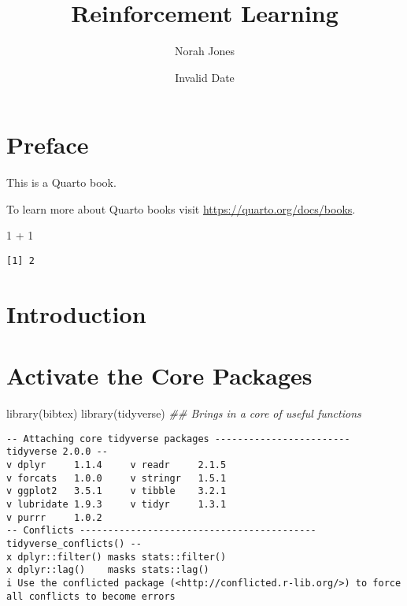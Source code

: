 \documentclass[
  letterpaper,
  DIV=11,
  numbers=noendperiod]{scrreprt}
\title{Reinforcement Learning}
\author{Norah Jones}
\date{Invalid Date}
\newenvironment{Shaded}{\begin{snugshade}}{\end{snugshade}}
\newcommand{\DecValTok}[1]{\textcolor[rgb]{0.68,0.00,0.00}{#1}}
\newcommand{\DocumentationTok}[1]{\textcolor[rgb]{0.37,0.37,0.37}{\textit{#1}}}
\newcommand{\FunctionTok}[1]{\textcolor[rgb]{0.28,0.35,0.67}{#1}}
\newcommand{\NormalTok}[1]{\textcolor[rgb]{0.00,0.23,0.31}{#1}}
\newcommand{\SpecialCharTok}[1]{\textcolor[rgb]{0.37,0.37,0.37}{#1}}
\renewcommand*\contentsname{Table of contents}
\newcommand\contentsname{Table of contents}
\begin{document}
\maketitle

\renewcommand*\contentsname{Table of contents}
{
\hypersetup{linkcolor=}
\setcounter{tocdepth}{2}
\tableofcontents
}


\chapter*{Preface}\label{preface}


This is a Quarto book.

To learn more about Quarto books visit
\url{https://quarto.org/docs/books}.

\begin{Shaded}
\begin{Highlighting}[]
\DecValTok{1} \SpecialCharTok{+} \DecValTok{1}
\end{Highlighting}
\end{Shaded}

\begin{verbatim}
[1] 2
\end{verbatim}


\chapter{Introduction}\label{introduction}


\chapter{Activate the Core Packages}\label{activate-the-core-packages}

\begin{Shaded}
\begin{Highlighting}[]
\FunctionTok{library}\NormalTok{(bibtex)}
\FunctionTok{library}\NormalTok{(tidyverse) }\DocumentationTok{\#\# Brings in a core of useful functions}
\end{Highlighting}
\end{Shaded}

\begin{verbatim}
-- Attaching core tidyverse packages ------------------------ tidyverse 2.0.0 --
v dplyr     1.1.4     v readr     2.1.5
v forcats   1.0.0     v stringr   1.5.1
v ggplot2   3.5.1     v tibble    3.2.1
v lubridate 1.9.3     v tidyr     1.3.1
v purrr     1.0.2     
-- Conflicts ------------------------------------------ tidyverse_conflicts() --
x dplyr::filter() masks stats::filter()
x dplyr::lag()    masks stats::lag()
i Use the conflicted package (<http://conflicted.r-lib.org/>) to force all conflicts to become errors
\end{verbatim}
\end{document}
